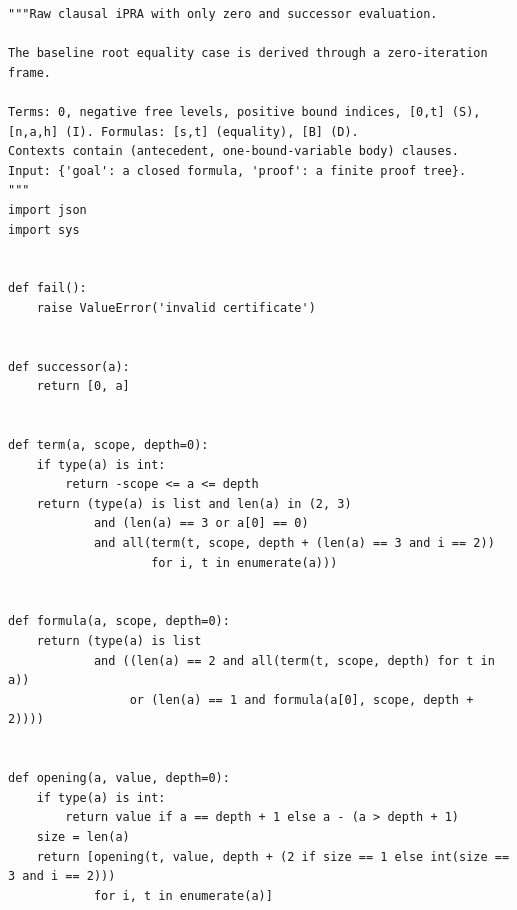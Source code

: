\documentclass[11pt,letterpaper]{article}
\theoremstyle{definition}
\begin{document}
\begin{lstlisting}
"""Raw clausal iPRA with only zero and successor evaluation.

The baseline root equality case is derived through a zero-iteration frame.

Terms: 0, negative free levels, positive bound indices, [0,t] (S),
[n,a,h] (I). Formulas: [s,t] (equality), [B] (D).
Contexts contain (antecedent, one-bound-variable body) clauses.
Input: {'goal': a closed formula, 'proof': a finite proof tree}.
"""
import json
import sys


def fail():
    raise ValueError('invalid certificate')


def successor(a):
    return [0, a]


def term(a, scope, depth=0):
    if type(a) is int:
        return -scope <= a <= depth
    return (type(a) is list and len(a) in (2, 3)
            and (len(a) == 3 or a[0] == 0)
            and all(term(t, scope, depth + (len(a) == 3 and i == 2))
                    for i, t in enumerate(a)))


def formula(a, scope, depth=0):
    return (type(a) is list
            and ((len(a) == 2 and all(term(t, scope, depth) for t in a))
                 or (len(a) == 1 and formula(a[0], scope, depth + 2))))


def opening(a, value, depth=0):
    if type(a) is int:
        return value if a == depth + 1 else a - (a > depth + 1)
    size = len(a)
    return [opening(t, value, depth + (2 if size == 1 else int(size == 3 and i == 2)))
            for i, t in enumerate(a)]



\end{lstlisting}
\end{document}
